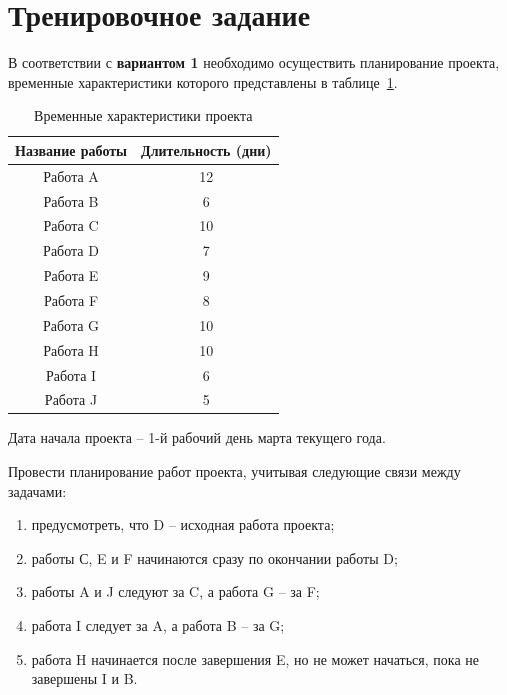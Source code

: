 \section*{Тренировочное задание}

В соответствии с \textbf{вариантом 1} необходимо осуществить планирование проекта, временные характеристики которого представлены в таблице~\ref{tbl:t_1}.

\captionsetup{justification=raggedright,singlelinecheck=off}
\begin{table}[h]
    \caption{\label{tbl:t_1}Временные характеристики проекта}
    \begin{center}
        \begin{tabular}{|c|c|}
                    \hline
              \textbf{Название работы} & \textbf{Длительность (дни)}            \\ \hline
            Работа A  & 12    \\ \hline
            Работа B & 6    \\ \hline
            Работа C  & 10    \\ \hline
            Работа D  & 7    \\ \hline
            Работа E  & 9    \\ \hline
            Работа F  & 8    \\ \hline
            Работа G  & 10    \\ \hline
            Работа H  & 10    \\ \hline
            Работа I  & 6    \\ \hline
            Работа J  & 5    \\ \hline
            \end{tabular}
    \end{center}
\end{table}

Дата начала проекта – 1-й рабочий день марта текущего года.

Провести планирование работ проекта, учитывая следующие связи между
задачами:

\begin{enumerate}
    \item предусмотреть, что D – исходная работа проекта;
    \item работы С, E и F начинаются сразу по окончании работы D;
    \item работы A и J следуют за C, а работа G – за F;
    \item работа I следует за A, а работа B – за G;
    \item работа H начинается после завершения E, но не может начаться, пока не завершены I и B.
\end{enumerate}

